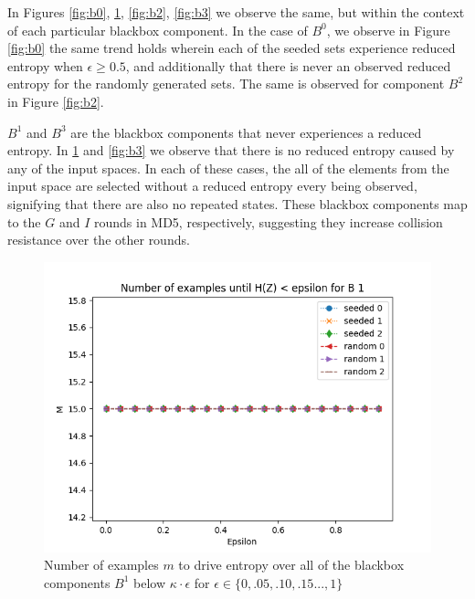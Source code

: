 \documentclass[letterpaper,twocolumn,10pt]{article}
\begin{document}
In Figures \ref{fig:b0}, \ref{fig:b1}, \ref{fig:b2}, \ref{fig:b3} we observe the same, but within the context of each particular blackbox component. In the case of $B^0$, we observe in Figure \ref{fig:b0} the same trend holds wherein each of the seeded sets experience reduced entropy when $\epsilon \geq 0.5$, and additionally that there is never an observed reduced entropy for the randomly generated sets. The same is observed for component $B^2$ in Figure \ref{fig:b2}.

$B^1$ and $B^3$ are the blackbox components that never experiences a reduced entropy. In \ref{fig:b1} and \ref{fig:b3} we observe that there is no reduced entropy caused by any of the input spaces. In each of these cases, the all of the elements from the input space are selected without a reduced entropy every being observed, signifying that there are also no repeated states. These blackbox components map to the $G$ and $I$ rounds in MD5, respectively, suggesting they increase collision resistance over the other rounds. 

\begin{figure}
\begin{centering}	
\includegraphics[width=\linewidth]{figs/seeded_1.png}
\end{centering}
\caption{\label{fig:b1} Number of examples $m$ to drive entropy over all of the blackbox components $B^{1}$ below $\kappa \cdot \epsilon$ for $\epsilon \in \{0, .05, .10, .15...,1\}$}
\end{figure}
\end{document}
